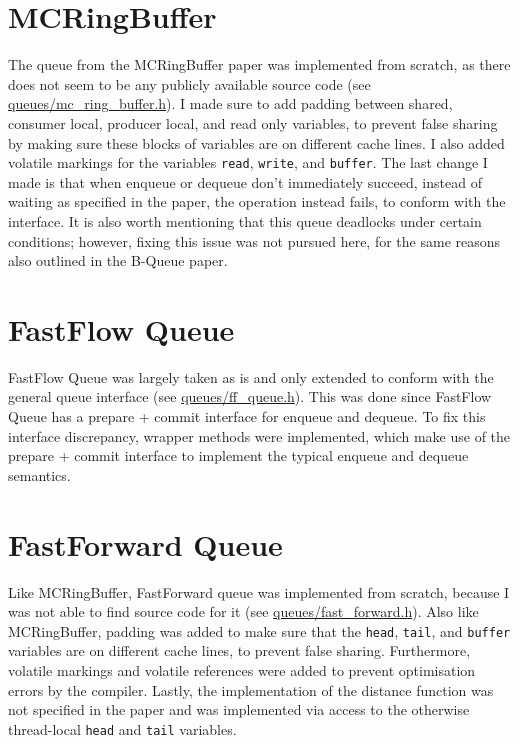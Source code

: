 \section{MCRingBuffer}
The queue from the MCRingBuffer paper was implemented from scratch, as there does not seem to be any publicly
available source code (see \href{https://github.com/Computerdores/ba/blob/main/src/queues/mc_ring_buffer.h}
{queues/mc\_ring\_buffer.h})\cite{MCRingBuffer}.
I made sure to add padding between shared, consumer local, producer local, and read only variables, to
prevent false sharing by making sure these blocks of variables are on different cache lines.
I also added volatile markings for the variables \texttt{read}, \texttt{write}, and \texttt{buffer}.
The last change I made is that when enqueue or dequeue don't immediately succeed, instead of waiting as
specified in the paper, the operation instead fails, to conform with the interface\cite{MCRingBuffer}.
It is also worth mentioning that this queue deadlocks under certain conditions; however, fixing this issue
was not pursued here, for the same reasons also outlined in the B-Queue paper\cite{B-Queue}.

\section{FastFlow Queue}
FastFlow Queue was largely taken as is and only extended to conform with the general queue
interface (see \href{https://github.com/Computerdores/ba/blob/main/src/queues/ff_queue.h}
{queues/ff\_queue.h})\cite{FastFlowGithub}.
This was done since FastFlow Queue has a prepare + commit interface for enqueue and dequeue.
To fix this interface discrepancy, wrapper methods were implemented, which make use of the prepare + commit
interface to implement the typical enqueue and dequeue semantics.

\section{FastForward Queue}
Like MCRingBuffer, FastForward queue was implemented from scratch, because I was not able to find source code
for it (see \href{https://github.com/Computerdores/ba/blob/main/src/queues/fast_forward.h}
{queues/fast\_forward.h})\cite{FastForward}.
Also like MCRingBuffer, padding was added to make sure that the \texttt{head}, \texttt{tail}, and
\texttt{buffer} variables are on different cache lines, to prevent false sharing.
Furthermore, volatile markings and volatile references were added to prevent optimisation errors by the compiler.
Lastly, the implementation of the distance function was not specified in the paper and was implemented via
access to the otherwise thread-local \texttt{head} and \texttt{tail} variables.


